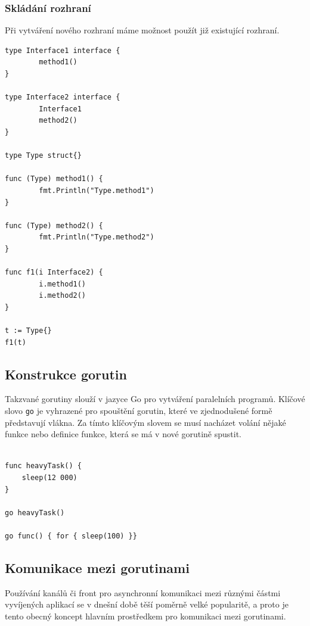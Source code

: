 \documentclass[12pt, a4paper]{article}
\begin{document}
\subsubsection{Skládání rozhraní}
Při vytváření nového rozhraní máme možnost použít již existující rozhraní.

\begin{lstlisting}[caption={Ukázka skládání rozhraní}, captionpos=b, language=Golang]
type Interface1 interface {
        method1()
}
 
type Interface2 interface {
        Interface1
        method2()
}
 
type Type struct{}
 
func (Type) method1() {
        fmt.Println("Type.method1")
}
 
func (Type) method2() {
        fmt.Println("Type.method2")
}
 
func f1(i Interface2) {
        i.method1()
        i.method2()
}

t := Type{}
f1(t)

\end{lstlisting}

\subsection{Konstrukce gorutin}
Takzvané gorutiny slouží v jazyce Go pro vytváření paralelních programů. Klíčové slovo \texttt{go} je vyhrazené pro spouštění gorutin, které ve zjednodušené formě představují vlákna. Za tímto klíčovým slovem se musí nacházet volání nějaké funkce nebo definice funkce, která se má v nové gorutině spustit.

\begin{lstlisting}[caption={Ukázka spouštění gorutin}, captionpos=b, language=Golang]

func heavyTask() {
    sleep(12 000)
}

go heavyTask() 

go func() { for { sleep(100) }}

\end{lstlisting}

\subsection{Komunikace mezi gorutinami}

Používání kanálů či front pro asynchronní komunikaci mezi různými částmi vyvíjených aplikací se v dnešní době těší poměrně velké popularitě, a proto je tento obecný koncept hlavním prostředkem pro komunikaci mezi gorutinami.
\end{document}
